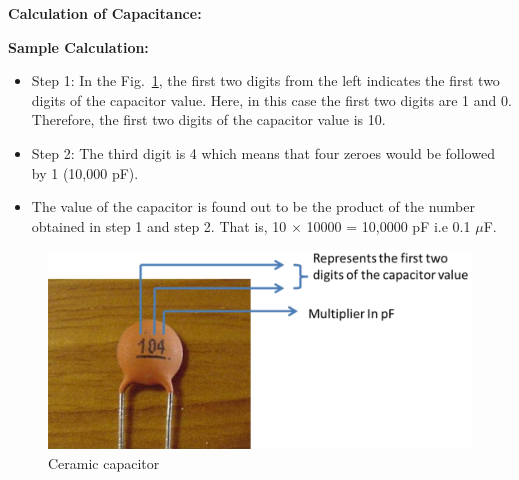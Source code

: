 \documentclass[9pt]{scrreprt}
\begin{document}
\textbf{Calculation of Capacitance:}

\textbf{Sample Calculation:}
\begin{itemize}
\item Step 1: In the Fig.~\ref{fig:Ceramic capacitor}, the first two digits from the left indicates the first two digits of the
capacitor value. Here, in this case the first two digits are 1 and 0. Therefore, the first two digits of
the capacitor value is 10.
\item Step 2: The third digit is 4 which means that four zeroes would be followed by 1 (10,000 pF).
\item The value of the capacitor is found out to be the product of the number obtained in step 1 and step
2. That is, 10 $\times$ 10000 = 10,0000 pF i.e 0.1 $\mu$F.
\end{itemize}

\begin{figure}[H]
	\centering
	\includegraphics[width=0.8\linewidth]{logos/Ceramic_capacitor.PNG}
	\caption{Ceramic capacitor}
	\label{fig:Ceramic capacitor}
\end{figure}
\end{document}
